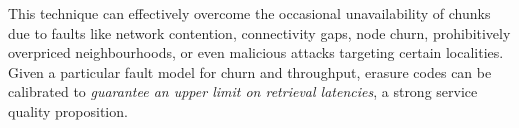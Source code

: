 This technique can effectively overcome the occasional unavailability of chunks due to faults like network contention, connectivity gaps, node churn, prohibitively overpriced neighbourhoods, or even malicious attacks targeting certain localities. Given a particular fault model for churn and throughput, erasure codes can be calibrated to
\emph{guarantee an upper limit on retrieval latencies}, a strong service quality proposition.


